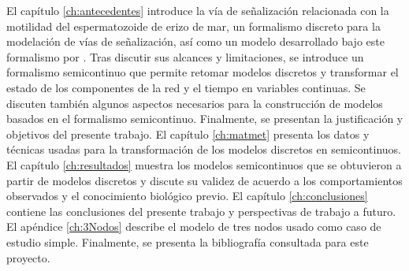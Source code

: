 El capítulo \ref{ch:antecedentes} introduce la vía de señalización relacionada con la motilidad del espermatozoide de erizo de mar, un formalismo discreto para la modelación de vías de señalización, así como un modelo desarrollado bajo este formalismo por \citeauthor{Espinal2011} \citep{Espinal2011}. Tras discutir sus alcances y limitaciones, se introduce un formalismo semicontinuo que permite retomar modelos discretos y transformar el estado de los componentes de la red y el tiempo en variables continuas. Se discuten también algunos aspectos necesarios para la construcción de modelos basados en el formalismo semicontinuo. Finalmente, se presentan la justificación y objetivos del presente trabajo. El capítulo \ref{ch:matmet} presenta los datos y técnicas usadas para la transformación de los modelos discretos en semicontinuos. El capítulo \ref{ch:resultados} muestra los modelos semicontinuos que se obtuvieron a partir de modelos discretos y discute su validez de acuerdo a los comportamientos observados y el conocimiento biológico previo. El capítulo \ref{ch:conclusiones} contiene las conclusiones del presente trabajo y perspectivas de trabajo a futuro. El apéndice \ref{ch:3Nodos} describe el modelo de tres nodos usado como caso de estudio simple. Finalmente, se presenta la bibliografía consultada para este proyecto.




